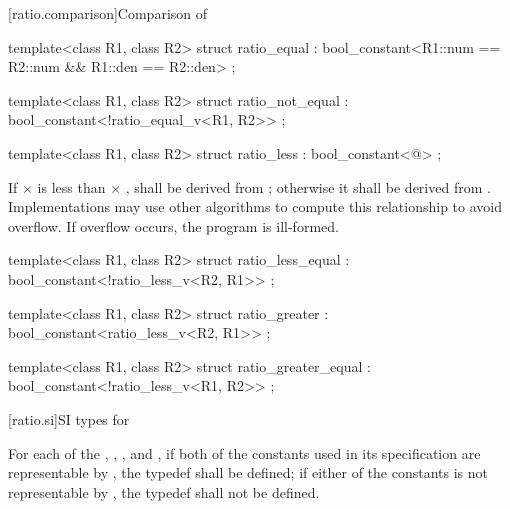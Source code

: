 [ratio.comparison]{Comparison of }

%
\begin{itemdecl}
template<class R1, class R2>
  struct ratio_equal : bool_constant<R1::num == R2::num && R1::den == R2::den> { };
\end{itemdecl}

%
\begin{itemdecl}
template<class R1, class R2>
  struct ratio_not_equal : bool_constant<!ratio_equal_v<R1, R2>> { };
\end{itemdecl}

%
\begin{itemdecl}
template<class R1, class R2>
  struct ratio_less : bool_constant<@\seebelow@> { };
\end{itemdecl}

\begin{itemdescr}
\pnum
If  $\times$  is less than  $\times$ ,
 shall be
derived from ; otherwise it shall be derived from
. Implementations may use other algorithms to
compute this relationship to avoid overflow. If overflow occurs, the program is ill-formed.
\end{itemdescr}

%
\begin{itemdecl}
template<class R1, class R2>
  struct ratio_less_equal : bool_constant<!ratio_less_v<R2, R1>> { };
\end{itemdecl}

%
\begin{itemdecl}
template<class R1, class R2>
  struct ratio_greater : bool_constant<ratio_less_v<R2, R1>> { };
\end{itemdecl}

%
\begin{itemdecl}
template<class R1, class R2>
  struct ratio_greater_equal : bool_constant<!ratio_less_v<R1, R2>> { };
\end{itemdecl}

[ratio.si]{SI types for }

\pnum
For each of the  , ,
, and , if both of the constants used in its
specification are representable by , the typedef shall be
defined; if either of the constants is not representable by ,
the typedef shall not be defined.

